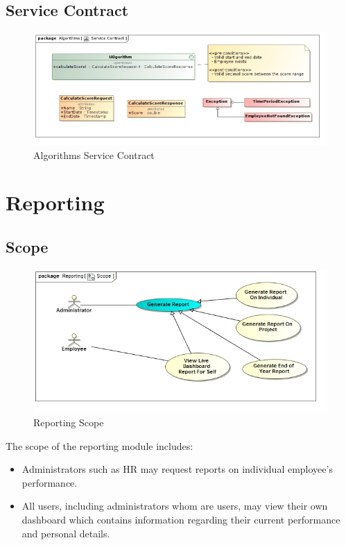 \documentclass[11pt,a4paper]{article}
\begin{document}
\subsection{Service Contract}
\begin{figure}[H]
	\begin{center}
		\includegraphics[scale=0.5]{../Images/Algorithms_Service_Contract.jpg}
		\caption{Algorithms Service Contract}
	\end{center}
\end{figure}

\pagebreak

\section{Reporting}
\subsection{Scope}
\begin{figure}[H]
	\begin{center}
		\includegraphics[scale=0.75]{../Images/Reporting_Scope.jpg}
		\caption{Reporting Scope}
	\end{center}
\end{figure}
The scope of the reporting module includes:
\begin{itemize}
	\item Administrators such as HR may request reports on individual employee's performance.
	\item All users, including administrators whom are users, may view their own dashboard which contains information regarding their current performance and personal details.
\end{itemize}
\end{document}
